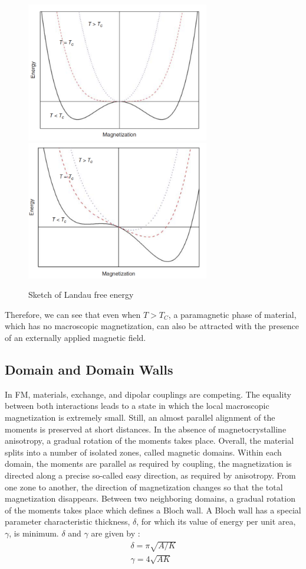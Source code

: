 \begin{figure}[H]
	\centering
	\includegraphics[width=80mm]{fig/review/landau1.png}\includegraphics[width=80mm]{fig/review/landau2.png}
	\caption[Sketch of Landau free energy.]{Sketch of Landau free energy}
\label{fig:landau}
\end{figure}

Therefore, we can see that even when $T >T_C$, a paramagnetic phase of material, which has no macroscopic magnetization, can also be attracted with the presence
of an externally applied magnetic field.

\subsection{Domain and Domain Walls}
In FM, materials, exchange, and dipolar couplings are competing.
The equality between both interactions leads to a state in which the local macroscopic magnetization is extremely small. Still, an almost parallel alignment of the moments is preserved at short distances.
In the absence of magnetocrystalline anisotropy, a gradual rotation of the moments takes place.
Overall, the material splits into a number of isolated zones, called magnetic domains.
Within each domain, the moments are parallel as required by coupling, the magnetization is directed along a precise so-called easy direction, as required by anisotropy. From one zone to another, the direction of magnetization changes so that the total magnetization disappears.
Between two neighboring domains, a gradual rotation of the moments takes place which defines a Bloch wall. A Bloch wall has a special parameter characteristic thickness, $\delta$, for which its value of energy per unit area, $\gamma$, is minimum. $\delta$ and $\gamma$ are given by :
\begin{align}
\delta = \pi \sqrt{A/K} \\
\gamma = 4 \sqrt{AK}
\end{align}

